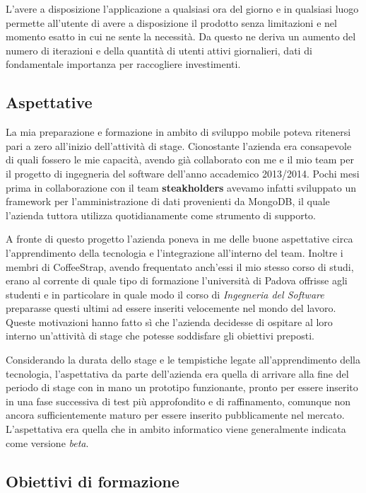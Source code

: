 L'avere a disposizione l'applicazione a qualsiasi ora del giorno e in qualsiasi luogo permette all'utente di avere a disposizione il prodotto senza limitazioni e nel momento esatto in cui ne sente la necessità. Da questo ne deriva un aumento del numero di iterazioni e della quantità di utenti attivi giornalieri, dati di fondamentale importanza per raccogliere investimenti.

\subsection{Aspettative}

La mia preparazione e formazione in ambito di sviluppo mobile poteva ritenersi pari a zero all'inizio dell'attività di stage. Cionostante l'azienda era consapevole di quali fossero le mie capacità, avendo già collaborato con me e il mio team per il progetto di ingegneria del software dell'anno accademico 2013/2014. Pochi mesi prima in collaborazione con il team \textbf{steakholders} avevamo infatti sviluppato un framework per l'amministrazione di dati provenienti da MongoDB, il quale l'azienda tuttora utilizza quotidianamente come strumento di supporto.

A fronte di questo progetto l'azienda poneva in me delle buone aspettative circa l'apprendimento della tecnologia e l'integrazione all'interno del team. Inoltre i membri di CoffeeStrap, avendo frequentato anch'essi il mio stesso corso di studi, erano al corrente di quale tipo di formazione l'università di Padova offrisse agli studenti e in particolare in quale modo il corso di \textit{Ingegneria del Software} preparasse questi ultimi ad essere inseriti velocemente nel mondo del lavoro. Queste motivazioni hanno fatto sì che l'azienda decidesse di ospitare al loro interno un'attività di stage che potesse soddisfare gli obiettivi preposti. 

Considerando la durata dello stage e le tempistiche legate all'apprendimento della tecnologia, l'aspettativa da parte dell'azienda era quella di arrivare alla fine del periodo di stage con in mano un prototipo funzionante, pronto per essere inserito in una fase successiva di test più approfondito e di raffinamento, comunque non ancora sufficientemente maturo per essere inserito pubblicamente nel mercato. L'aspettativa era quella che in ambito informatico viene generalmente indicata come versione \textit{beta}.

\subsection{Obiettivi di formazione}

